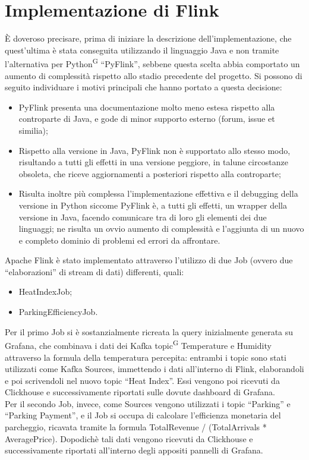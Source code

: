 \documentclass[8pt]{article}
\newcommand{\glossterm}[1]{#1\textsuperscript{G}} %
\begin{document}
\section{Implementazione di Flink}\label{sec:impl}
È doveroso precisare, prima di iniziare la descrizione dell'implementazione, che quest'ultima è stata conseguita utilizzando il linguaggio Java e non tramite l'alternativa per \glossterm{Python} ``PyFlink'', sebbene questa scelta abbia comportato un aumento di complessità rispetto allo stadio precedente del progetto. Si possono di seguito individuare i motivi principali che hanno portato a questa decisione:
\begin{itemize}
\setlength\itemsep{0em}
	\item PyFlink presenta una documentazione molto meno estesa rispetto alla controparte di Java, e gode di minor supporto esterno (forum, issue et similia); 
	\item Rispetto alla versione in Java, PyFlink non è supportato allo stesso modo, risultando a tutti gli effetti in una versione peggiore, in talune circostanze obsoleta, che riceve aggiornamenti a posteriori rispetto alla controparte;
	\item Risulta inoltre più complessa l'implementazione effettiva e il debugging della versione in Python siccome PyFlink è, a tutti gli effetti, un wrapper della versione in Java, facendo comunicare tra di loro gli elementi dei due linguaggi; ne risulta un ovvio aumento di complessità e l'aggiunta di un nuovo e completo dominio di problemi ed errori da affrontare.
\end{itemize}
Apache Flink è stato implementato attraverso l'utilizzo di due Job (ovvero due ``elaborazioni'' di stream di dati) differenti, quali:
\begin{itemize}
\setlength\itemsep{0em}
	\item HeatIndexJob;
	\item ParkingEfficiencyJob.
\end{itemize}
Per il primo Job si è sostanzialmente ricreata la query inizialmente generata su Grafana, che combinava i dati dei Kafka \glossterm{topic} Temperature e Humidity attraverso la formula della temperatura percepita: entrambi i topic sono stati utilizzati come Kafka Sources, immettendo i dati all'interno di Flink, elaborandoli e poi scrivendoli nel nuovo topic ``Heat Index''. Essi vengono poi ricevuti da Clickhouse e successivamente riportati sulle dovute dashboard di Grafana. \\
Per il secondo Job, invece, come Sources vengono utilizzati i topic ``Parking'' e ``Parking Payment'', e il Job si occupa di calcolare l'efficienza monetaria del parcheggio, ricavata tramite la formula Total\textunderscore Revenue / (Total\textunderscore Arrivals * Average\textunderscore Price). Dopodichè tali dati vengono ricevuti da Clickhouse e successivamente riportati all'interno degli appositi pannelli di Grafana.
\end{document}
